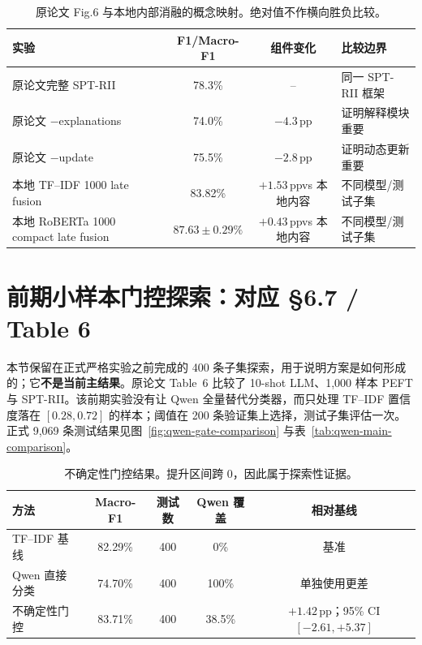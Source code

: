 \documentclass[UTF8,zihao=-4,a4paper]{ctexart}
\newcommand{\pp}{\,pp}
\begin{document}
\begin{table}[H]
\centering
\small
\caption{原论文 Fig.6 与本地内部消融的概念映射。绝对值不作横向胜负比较。}
\label{tab:fig6-map}
\begin{tabularx}{\textwidth}{X c c X}
\toprule
实验 & F1/Macro-F1 & 组件变化 & 比较边界 \\
\midrule
原论文完整 SPT-RII & 78.3\% & -- & 同一 SPT-RII 框架 \\
原论文 $-$explanations & 74.0\% & $-4.3$\pp & 证明解释模块重要 \\
原论文 $-$update & 75.5\% & $-2.8$\pp & 证明动态更新重要 \\
本地 TF--IDF 1000 late fusion & 83.82\% & $+1.53$\pp vs 本地内容 & 不同模型/测试子集 \\
本地 RoBERTa 1000 compact late fusion & $87.63\pm0.29\%$ & $+0.43$\pp vs 本地内容 & 不同模型/测试子集 \\
\bottomrule
\end{tabularx}
\end{table}

\clearpage
\section{前期小样本门控探索：对应 \S6.7 / Table 6}

本节保留在正式严格实验之前完成的 400 条子集探索，用于说明方案是如何形成的；它\textbf{不是当前主结果}。原论文 Table~6 比较了 10-shot LLM、1,000 样本 PEFT 与 SPT-RII。该前期实验没有让 Qwen 全量替代分类器，而只处理 TF--IDF 置信度落在 $[0.28,0.72]$ 的样本；阈值在 200 条验证集上选择，测试子集评估一次。正式 9,069 条测试结果见图~\ref{fig:qwen-gate-comparison} 与表~\ref{tab:qwen-main-comparison}。

\begin{table}[H]
\centering
\small
\caption{不确定性门控结果。提升区间跨 0，因此属于探索性证据。}
\label{tab:gate-comparison}
\begin{tabular}{lcccc}
\toprule
方法 & Macro-F1 & 测试数 & Qwen 覆盖 & 相对基线 \\
\midrule
TF--IDF 基线 & 82.29\% & 400 & 0\% & 基准 \\
Qwen 直接分类 & 74.70\% & 400 & 100\% & 单独使用更差 \\
\rowcolor{LightGreen}不确定性门控 & 83.71\% & 400 & 38.5\% & $+1.42$\pp；95\% CI $[-2.61,+5.37]$ \\
\bottomrule
\end{tabular}
\end{table}
\end{document}
